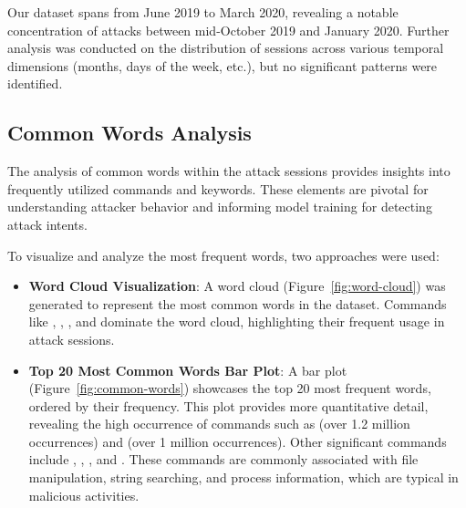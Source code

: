         
        Our dataset spans from June 2019 to March 2020, revealing a notable concentration of attacks between mid-October 2019 and January 2020.
        Further analysis was conducted on the distribution of sessions across various temporal dimensions (months, days of the week, etc.), but no significant patterns were identified.
        

    \subsection{Common Words Analysis}
    
        The analysis of common words within the attack sessions provides insights into frequently utilized commands and keywords. These elements are pivotal for understanding attacker behavior and informing model training for detecting attack intents. 

        To visualize and analyze the most frequent words, two approaches were used: 
        
        \vspace{0.2em}

        \begin{itemize}
        
            \item \textbf{Word Cloud Visualization}: A word cloud (Figure~\ref{fig:word-cloud}) was generated to represent the most common words in the dataset. Commands like , , , and  dominate the word cloud, highlighting their frequent usage in attack sessions.
            
            \vspace{0.2em}

            \item \textbf{Top 20 Most Common Words Bar Plot}: A bar plot (Figure~\ref{fig:common-words}) showcases the top 20 most frequent words, ordered by their frequency. This plot provides more quantitative detail, revealing the high occurrence of commands such as  (over 1.2 million occurrences) and  (over 1 million occurrences). Other significant commands include , , , and . These commands are commonly associated with file manipulation, string searching, and process information, which are typical in malicious activities.
            
        \end{itemize}
        

